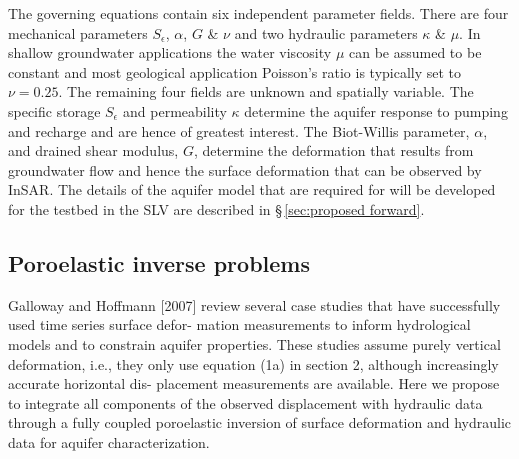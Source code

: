 \documentclass[11pt,final]{article}%
\newcommand{\Stor}{S_{\epsilon}}
\begin{document}
The governing equations contain six independent parameter fields. There are four mechanical parameters $\Stor$, $\alpha$, $G$ \& $\nu$ and two hydraulic parameters $\kappa$ \& $\mu$. In shallow groundwater applications the water viscosity $\mu$ can be assumed to be constant and most geological application Poisson's ratio is typically set to $\nu = 0.25$. The remaining four fields are unknown and spatially variable. The specific storage $\Stor$ and permeability $\kappa$ determine the aquifer response to pumping and recharge and are hence of greatest interest. The Biot-Willis parameter, $\alpha$, and drained shear modulus, $G$, determine the deformation that results from groundwater flow and hence the surface deformation that can be observed by InSAR. The details of the aquifer model that are required for will be developed for the testbed in the SLV are described in \S\,\ref{sec:proposed forward}. 

\subsection{Poroelastic inverse problems}
Galloway and Hoffmann [2007]\cite{Gall} review several case studies that have successfully used time series surface defor- mation measurements to inform hydrological models and to constrain aquifer properties. These studies assume purely vertical deformation, i.e., they only use equation (1a) in section 2, although increasingly accurate horizontal dis- placement measurements are available. Here we propose to integrate all components of the observed displacement with hydraulic data through a fully coupled poroelastic inversion of surface deformation and hydraulic data for aquifer characterization.
\end{document}

